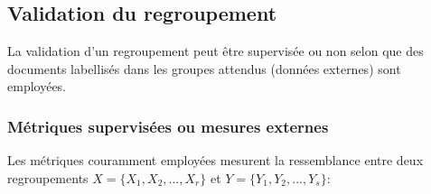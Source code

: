 


\subsection{Validation du regroupement}
La validation d'un regroupement peut être supervisée ou non selon que des documents labellisés dans les groupes attendus (données externes) sont employées.

\subsubsection{Métriques supervisées ou mesures externes}
\label{sec:similarite:biblio:supeval}
Les métriques couramment employées mesurent la ressemblance entre deux regroupements $X = \lbrace X_1, X_2,..., X_r \rbrace$ et $Y = \lbrace Y_1,Y_2,..., Y_s \rbrace$:
